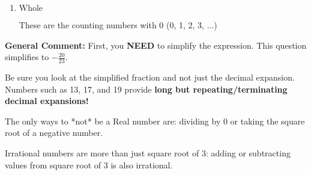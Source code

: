 \documentclass{extbook}[14pt]
\begin{document}
\begin{enumerate}
{\begin{enumerate}[label=\Alph*.]
* This is the correct option!
\item \( \text{Whole} \)

These are the counting numbers with 0 (0, 1, 2, 3, ...)
\end{enumerate}

\textbf{General Comment:} First, you \textbf{NEED} to simplify the expression. This question simplifies to $-\frac{20}{23}$. 
 
 Be sure you look at the simplified fraction and not just the decimal expansion. Numbers such as 13, 17, and 19 provide \textbf{long but repeating/terminating decimal expansions!} 
 
 The only ways to *not* be a Real number are: dividing by 0 or taking the square root of a negative number. 
 
 Irrational numbers are more than just square root of 3: adding or subtracting values from square root of 3 is also irrational.
}
\end{enumerate}
\end{document}
